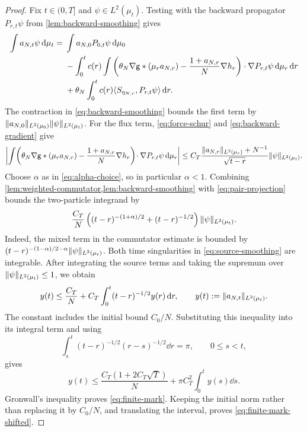 \documentclass[11pt,reqno]{amsart}
\numberwithin{equation}{section}
\theoremstyle{plain}
\theoremstyle{remark}
\DeclarePairedDelimiter{\norm}{\lVert}{\rVert}
\begin{document}
\begin{proof}
Fix $t\in(0,T]$ and $\psi\in L^2(\mu_t)$. Testing with the backward propagator $P_{r,t}\psi$ from \cref{lem:backward-smoothing} gives
\begin{align}
 \int a_{N,t}\psi\,\mathrm d\mu_t
 ={}&\int a_{N,0}P_{0,t}\psi\,\mathrm d\mu_0\notag\\
 &-\int_0^t c(r)\int\left(\theta_N\nabla\mathsf g*(\mu_ra_{N,r})
                 -\frac{1+a_{N,r}}N\nabla h_r\right)
                   \cdot\nabla P_{r,t}\psi\,\mathrm d\mu_r\,\mathrm d r\notag\\
 &+\theta_N\int_0^tc(r)\langle S_{\eta_{N,r}},P_{r,t}\psi\rangle\,\mathrm d r.
 \label{eq:first-mark-duhamel}
\end{align}
The contraction in \eqref{eq:backward-smoothing} bounds the first term by
$\norm{a_{N,0}}_{L^2(\mu_0)}\norm\psi_{L^2(\mu_t)}$.
For the flux term, \eqref{eq:force-schur} and \eqref{eq:backward-gradient} give
\begin{equation}\label{eq:first-mark-flux-bound}
 \left|\int\!\left(\theta_N\nabla\g*(\mu_ra_{N,r})-\frac{1+a_{N,r}}N\nabla h_r\right)\!\cdot\nabla P_{r,t}\psi\dd\mu_r\right|
 \le C_T\frac{\norm{a_{N,r}}_{L^2(\mu_r)}+N^{-1}}{\sqrt{t-r}}\norm\psi_{L^2(\mu_t)}.
\end{equation}
Choose $\alpha$ as in \eqref{eq:alpha-choice}, so in particular $\alpha<1$.
Combining \cref{lem:weighted-commutator,lem:backward-smoothing} with \eqref{eq:pair-projection} bounds the two-particle integrand by
\begin{equation}\label{eq:source-smoothing}
 \frac{C_T}N\left((t-r)^{-(1+\alpha)/2}+(t-r)^{-1/2}\right)\norm\psi_{L^2(\mu_t)}.
\end{equation}
Indeed, the mixed term in the commutator estimate is bounded by
$(t-r)^{-(1-\alpha)/2-\alpha}\norm\psi_{L^2(\mu_t)}$.
Both time singularities in \eqref{eq:source-smoothing} are integrable. After integrating the source terms and taking the supremum over $\norm\psi_{L^2(\mu_t)}\le1$, we obtain
\begin{equation}\label{eq:weighted-volterra}
 y(t)\le\frac{C_T}N+C_T\int_0^t(t-r)^{-1/2}y(r)\dd r,
             \qquad y(t):=\norm{a_{N,t}}_{L^2(\mu_t)}.
\end{equation}
The constant includes the initial bound $C_0/N$. Substituting this inequality into its integral term and using
\begin{equation}\label{eq:volterra-convolution}
 \int_s^t(t-r)^{-1/2}(r-s)^{-1/2}\dd r=\pi,
 \qquad 0\le s<t,
\end{equation}
gives
\begin{equation}\label{eq:volterra-gronwall}
 y(t)\le\frac{C_T(1+2C_T\sqrt T)}N
               +\pi C_T^2\int_0^t y(s)\dd s.
\end{equation}
Gronwall's inequality proves \eqref{eq:finite-mark}. Keeping the initial norm rather than replacing it by $C_0/N$, and translating the interval, proves \eqref{eq:finite-mark-shifted}.


\end{proof}
\end{document}
